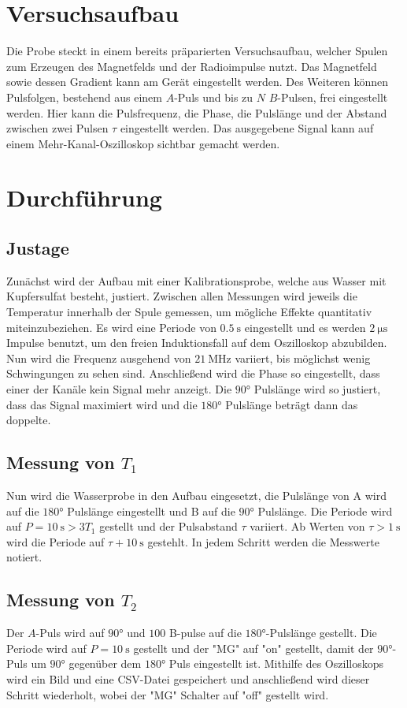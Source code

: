 \section{Versuchsaufbau}
Die Probe steckt in einem bereits präparierten Versuchsaufbau, welcher Spulen zum Erzeugen des Magnetfelds und der Radioimpulse nutzt.
Das Magnetfeld sowie dessen Gradient kann am Gerät eingestellt werden. 
Des Weiteren können Pulsfolgen, bestehend aus einem $A$-Puls und bis zu $N$ $B$-Pulsen, frei eingestellt werden.
Hier kann die Pulsfrequenz, die Phase, die Pulslänge und der Abstand zwischen zwei Pulsen $\tau$ eingestellt werden.
Das ausgegebene Signal kann auf einem Mehr-Kanal-Oszilloskop sichtbar gemacht werden.
\section{Durchführung}
\subsection{Justage}
Zunächst wird der Aufbau mit einer Kalibrationsprobe, welche aus Wasser mit Kupfersulfat besteht, justiert.
Zwischen allen Messungen wird jeweils die Temperatur innerhalb der Spule gemessen, um mögliche Effekte quantitativ miteinzubeziehen.
Es wird eine Periode von $\SI{0.5}{\second} $ eingestellt und es werden $\SI{2}{\micro\second}$ Impulse benutzt, um den freien Induktionsfall auf dem Oszilloskop abzubilden.
Nun wird die Frequenz ausgehend von $\SI{21}{\MHz}$ variiert, bis möglichst wenig Schwingungen zu sehen sind. Anschließend wird die Phase so eingestellt, dass einer der Kanäle kein Signal mehr anzeigt.
Die $90°$ Pulslänge wird so justiert, dass das Signal maximiert wird und die $180°$ Pulslänge beträgt dann das doppelte.
\subsection{Messung von $T_1$}
Nun wird die Wasserprobe in den Aufbau eingesetzt, die Pulslänge von A wird auf die $180°$ Pulslänge eingestellt und B auf die $90°$ Pulslänge. Die Periode wird auf $ P = \SI{10}{\second} > 3 T_1$ gestellt und der Pulsabstand $\tau $ variiert. 
Ab Werten von $\tau >\SI{1}{\second}$ wird die Periode auf $\tau + \SI{10}{\second}$ gestehlt. In jedem Schritt werden die Messwerte notiert.
\subsection{Messung von $T_2$}
Der $A$-Puls wird auf $90°$ und $100$ B-pulse auf die $180°$-Pulslänge gestellt.
Die Periode wird auf $P = \SI{10}{\second}$ gestellt und der "MG" auf "on" gestellt, damit der $90°$-Puls um $90°$ gegenüber dem $180°$ Puls eingestellt ist.
Mithilfe des Oszilloskops wird ein Bild und eine CSV-Datei gespeichert und anschließend wird dieser Schritt wiederholt, wobei der "MG" Schalter auf "off" gestellt wird.
